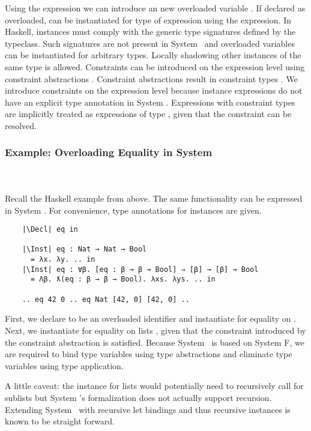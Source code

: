 \noindent Using the  expression we can introduce an new overloaded variable . 
If declared as overloaded,  can be instantiated for type  of expression  using the  expression.
In Haskell, instances must comply with the generic type signatures defined by the typeclass. Such signatures are not present in System \Fo\ and overloaded variables can be instantiated for arbitrary types.
Locally shadowing other instances of the same type is allowed.
Constraints can be introduced on the expression level using constraint abstractions . 
Constraint abstractions result in constraint types . 
We introduce constraints on the expression level because instance expressions do not have an explicit type annotation in System \Fo.
Expressions with constraint types  are implicitly treated as expressions of type , given that the constraint  can be resolved.

\subsubsection{Example: Overloading Equality in System \Fo}\hfill\\\\
Recall the Haskell example from above. 
The same functionality can be expressed in System \Fo. 
For convenience, type annotations for instances are given.
\begin{verbatim}
    |\Decl| eq in

    |\Inst| eq : Nat → Nat → Bool 
      = λx. λy. .. in
    |\Inst| eq : ∀β. [eq : β → β → Bool] ⇒ [β] → [β] → Bool 
      = Λβ. ƛ(eq : β → β → Bool). λxs. λys. .. in

    .. eq 42 0 .. eq Nat [42, 0] [42, 0] .. 
\end{verbatim} 
First, we declare  to be an overloaded identifier and instantiate  for equality on . 
Next, we instantiate  for equality on lists \inl{[β]}, given that the constraint  introduced by the constraint abstraction  is satisfied. 
Because System \Fo\ is based on System F, we are required to bind type variables using type abstractions  and eliminate type variables using type application. 

\noindent A little caveat: the instance for lists would potentially need to recursively call  for sublists but System \Fo's formalization does not actually support recursion. Extending System \Fo\ with recursive let bindings and thus recursive instances is known to be straight forward. 

